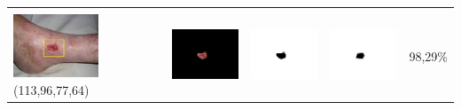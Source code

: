 \begin{table}[H]
\begin{tabular}{|m{1.0in}|m{1.0in}|m{1.0in}|m{1.0in}|m{0.6in}|}
		
		&  &  & \\
		\includegraphics[width=1.0in]{gambar/hasil_segmentasi/luka_merah/image_30_rect.jpg} {\centering\fontsize{10}{10}\selectfont(113,96,77,64)}&
		\includegraphics[width=1.0in]{gambar/hasil_segmentasi/luka_merah/result_30.jpg}&
		\includegraphics[width=1.0in]{gambar/hasil_segmentasi/luka_merah/mask_r_30.jpg}&
		\includegraphics[width=1.0in]{gambar/hasil_segmentasi/luka_merah/30_r.jpg}&
		98,29\% \\
		\hline
	\end{tabular}
\end{table}


